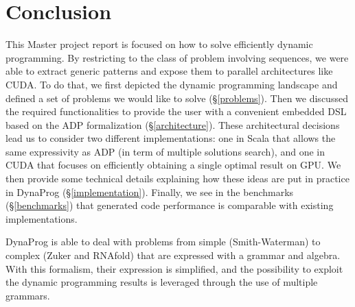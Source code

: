 \newpage
\section{Conclusion}
This Master project report is focused on how to solve efficiently dynamic programming. By restricting to the class of problem involving sequences, we were able to extract generic patterns and expose them to parallel architectures like CUDA. To do that, we first depicted the dynamic programming landscape and defined a set of problems we would like to solve (\S\ref{problems}). Then we discussed the required functionalities to provide the user with a convenient embedded DSL based on the ADP formalization (\S\ref{architecture}). These architectural decisions lead us to consider two different implementations: one in Scala that allows the same expressivity as ADP (in term of multiple solutions search), and one in CUDA that focuses on efficiently obtaining a single optimal result on GPU. We then provide some technical details explaining how these ideas are put in practice in DynaProg (\S\ref{implementation}). Finally, we see in the benchmarks (\S\ref{benchmarks}) that generated code performance is comparable with existing implementations.

DynaProg is able to deal with problems from simple (Smith-Waterman) to complex (Zuker and RNAfold) that are expressed with a grammar and algebra. With this formalism, their expression is simplified, and the possibility to exploit the dynamic programming results is leveraged through the use of multiple grammars.

